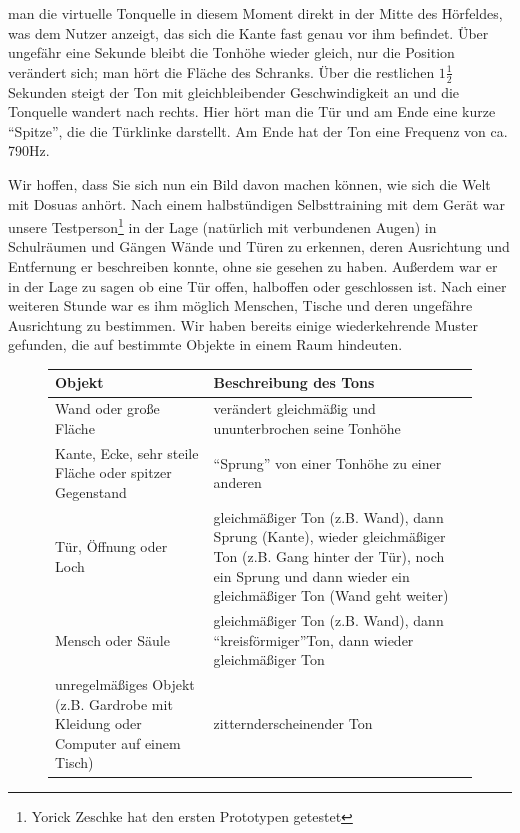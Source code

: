 \documentclass[a4paper,12pt,ngerman]{scrartcl}
\begin{document}
man die virtuelle Tonquelle in diesem Moment direkt in der Mitte des Hörfeldes, was dem Nutzer anzeigt, das sich
die Kante fast genau vor ihm befindet. Über ungefähr eine Sekunde bleibt die Tonhöhe wieder gleich, nur die Position
verändert sich; man hört die Fläche des Schranks. Über die restlichen $1\frac{1}{2}$ Sekunden steigt der Ton mit 
gleichbleibender Geschwindigkeit an und die Tonquelle wandert nach rechts.
Hier hört man die Tür und am Ende eine kurze \enquote{Spitze}, die die Türklinke darstellt. Am Ende hat der Ton
eine Frequenz von ca. 790Hz.\par 
Wir hoffen, dass Sie sich nun ein Bild davon machen können, wie sich die Welt mit Dosuas anhört. Nach einem
halbstündigen Selbsttraining mit dem Gerät war unsere Testperson\footnote{Yorick Zeschke hat den ersten Prototypen
getestet} in der Lage (natürlich mit verbundenen Augen) in Schulräumen und Gängen
Wände und Türen zu erkennen, deren Ausrichtung und Entfernung er beschreiben konnte, ohne sie gesehen zu haben.
Außerdem war er in der Lage zu sagen ob eine Tür offen, halboffen oder geschlossen ist. Nach einer weiteren Stunde
war es ihm möglich Menschen, Tische und deren ungefähre Ausrichtung zu bestimmen. 
Wir haben bereits einige wiederkehrende Muster gefunden, die auf bestimmte Objekte in einem Raum hindeuten. 
\begin{figure}[h]
	\begin{tabular}{| p{} | p{} |}
		\hline
		Objekt & Beschreibung des Tons \\ \hline
		Wand oder große Fläche & verändert gleichmäßig und ununterbrochen seine Tonhöhe \\ \hline
		Kante, Ecke, sehr steile Fläche oder spitzer Gegenstand & \enquote{Sprung} von einer Tonhöhe zu einer 
		anderen \\ \hline
		Tür, Öffnung oder Loch & gleichmäßiger Ton (z.B. Wand), dann Sprung (Kante), wieder gleichmäßiger Ton
		(z.B. Gang hinter der Tür), noch ein Sprung und dann wieder ein gleichmäßiger Ton (Wand geht weiter) \\ \hline 
		Mensch oder Säule & gleichmäßiger Ton (z.B. Wand), dann \enquote{kreisförmiger}\footnotemark Ton, dann wieder gleichmäßiger Ton \\ \hline
		unregelmäßiges Objekt (z.B. Gardrobe mit Kleidung oder Computer auf einem Tisch) & zitternd\footnotemark erscheinender Ton \\ \hline 
	\end{tabular}
\end{figure} \par
\end{document}
